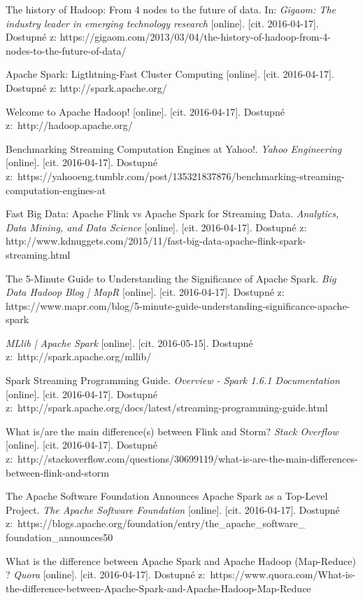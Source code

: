 \documentclass[thesis=B,czech]{FITthesis}[2012/06/26]
\begin{document}
\begin{thebibliography}{1}
The history of Hadoop: From 4 nodes to the future of data. In: \textit{Gigaom: The industry leader in emerging technology research} [online]. [cit. 2016-04-17]. Dostupné z: https://gigaom.com/2013/03/04/the-history-of-hadoop-from-4-nodes-to-the-future-of-data/

Apache Spark: Ligthtning-Fast Cluster Computing [online]. [cit. 2016-04-17]. Dostupné z: http://spark.apache.org/

Welcome to Apache Hadoop! [online]. [cit. 2016-04-17]. Dostupné z:~http://hadoop.apache.org/

Benchmarking Streaming Computation Engines at Yahoo!. \textit{Yahoo Engineering} [online]. [cit. 2016-04-17]. Dostupné z:~https://yahooeng.tumblr.com/post/135321837876/benchmarking-streaming-computation-engines-at

Fast Big Data: Apache Flink vs Apache Spark for Streaming Data. \textit{Analytics, Data Mining, and Data Science} [online]. [cit. 2016-04-17]. Dostupné z: http://www.kdnuggets.com/2015/11/fast-big-data-apache-flink-spark-streaming.html

The 5-Minute Guide to Understanding the Significance of Apache Spark. \textit{Big Data Hadoop Blog | MapR} [online]. [cit. 2016-04-17]. Dostupné z: https://www.mapr.com/blog/5-minute-guide-understanding-significance-apache-spark

\textit{MLlib | Apache Spark} [online]. [cit. 2016-05-15]. Dostupné z:~http://spark.apache.org/mllib/

Spark Streaming Programming Guide. \textit{Overview - Spark 1.6.1 Documentation} [online]. [cit. 2016-04-17]. Dostupné z:~http://spark.apache.org/docs/latest/streaming-programming-guide.html

What is/are the main difference(s) between Flink and Storm? \textit{Stack Overflow} [online]. [cit. 2016-04-17]. Dostupné z:~http://stackoverflow.com/questions/30699119/what-is-are-the-main-differences-between-flink-and-storm

The Apache Software Foundation Announces Apache Spark as a Top-Level Project. \textit{The Apache Software Foundation} [online]. [cit. 2016-04-17]. Dostupné z:~https://blogs.apache.org/foundation/entry/the\_apache\_software\_\\foundation\_announces50

What is the difference between Apache Spark and Apache Hadoop (Map-Reduce) ? \textit{Quora} [online]. [cit. 2016-04-17]. Dostupné z:~https://www.quora.com/What-is-the-difference-between-Apache-Spark-and-Apache-Hadoop-Map-Reduce


\end{thebibliography}
\end{document}
